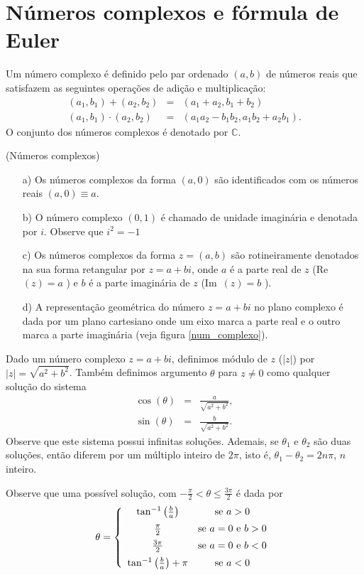 \section{Números complexos e fórmula de Euler}
\begin{defn} Um número complexo é definido pelo par ordenado $(a,b)$ de números reais que satisfazem as seguintes operações de adição e multiplicação:
\begin{eqnarray*}
(a_1,b_1)+(a_2,b_2)&=&(a_1+a_2,b_1+b_2)\\
(a_1,b_1)\cdot(a_2,b_2)&=&(a_1a_2-b_1b_2,a_1b_2+a_2b_1).
\end{eqnarray*}
O conjunto dos números complexos é denotado por $\mathbb{C}$.
\end{defn}
\begin{obs}(Números complexos)
\begin{itemize} 
\item[a)] Os números complexos da forma $(a,0)$ são identificados com os números reais $(a,0)\equiv a$.
\item[b)] O número complexo $(0,1)$ é chamado de unidade imaginária e denotada por $i$. Observe que $i^2=-1$
\item[c)] Os números complexos da forma $z=(a,b)$ são rotineiramente denotados na sua forma retangular por $z=a+bi$, onde $a$ é a parte real de $z$ (Re\ \!$(z)=a$ ) e $b$ é a parte imaginária de $z$ (Im\ \!$(z)=b$ ).
\item[d)] A representação geométrica do número $z=a+bi$ no plano complexo é dada por um plano cartesiano onde um eixo marca a parte real e o outro marca a parte imaginária (veja figura \ref{num_complexo}).
\end{itemize}
\end{obs}

\begin{defn}Dado um número complexo $z=a+bi$, definimos módulo de $z$ ($|z|$) por $|z|=\sqrt{a^2+b^2}$. Também definimos argumento $\theta$ para $z\neq 0$ como qualquer  solução do sistema
\begin{eqnarray}
 \cos(\theta)&=&\frac{a}{\sqrt{a^2+b^2}},\\
 \sin(\theta)&=&\frac{b}{\sqrt{a^2+b^2}}.
\end{eqnarray}
Observe que este sistema possui infinitas soluções. Ademais, se $\theta_1$ e $\theta_2$ são duas soluções, então diferem por um múltiplo inteiro de $2\pi$, isto é, $\theta_1-\theta_2=2n\pi$, $n$ inteiro.
\end{defn}

Observe que uma possível solução, com $-\frac{\pi}{2}<\theta\leq \frac{3\pi}{2}$ é dada por
$$
\theta=\left\{\begin{array}{cc}\tan^{-1}\left(\frac{b}{a}\right)&\hbox{se}\ a>0\\[5pt]
\frac{\pi}{2}&\hbox{se}\ a=0\ \hbox{e}\ b>0\\[5pt]
\frac{3\pi}{2}&\hbox{se}\ a=0\ \hbox{e}\ b<0 \\[5pt] 
\tan^{-1}\left(\frac{b}{a}\right)+\pi&\hbox{se}\ a<0\end{array}\right.
$$

